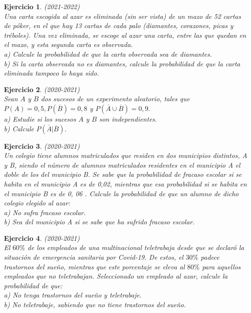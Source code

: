 \documentclass[12pt, a4paper]{amsart}
\newtheorem{ejer}{Ejercicio}
\begin{document}
\begin{ejer}\em (2021-2022)\\
Una carta escogida al azar es eliminada (sin ser vista) de un mazo de 52 cartas de póker, en el que hay 13 cartas de cada palo (diamantes, corazones, picas y tréboles). Una vez eliminada, se escoge al azar una carta, entre las que quedan en el mazo, y esta segunda carta es observada.\\
a) Calcule la probabilidad de que la carta observada sea de diamantes.\\
b) Si la carta observada no es diamantes, calcule la probabilidad de que la carta eliminada tampoco lo haya sido.
\end{ejer}

\begin{ejer}\em (2020-2021)\\
Sean $A$ y $B$ dos sucesos de un experimento aleatorio, tales que $P (A) = 0, 5 , P (\overline{B}) = 0, 8$ y $P (\overline{A} \cup \overline{B}) = 0, 9.$\\
a) Estudie si los sucesos $A$ y $B$ son independientes.\\
b) Calcule $P (\overline{A}|\overline{B}) .$
\end{ejer}

\begin{ejer}\em (2020-2021)\\
Un colegio tiene alumnos matriculados que residen en dos municipios distintos, A y B, siendo el número de alumnos matriculados residentes en el municipio A el doble de los del municipio B. Se sabe que la probabilidad de fracaso escolar si se habita en el municipio A es de 0,02, mientras que esa probabilidad si se habita en el municipio B es de 0, 06 . Calcule la probabilidad de que un alumno de dicho colegio elegido al azar:\\
a) No sufra fracaso escolar.\\
b) Sea del municipio A si se sabe que ha sufrido fracaso escolar.
\end{ejer}

\begin{ejer}\em (2020-2021)\\
El $60\%$ de los empleados de una multinacional teletrabaja desde que se declaró la situación de emergencia
sanitaria por Covid-19. De estos, el $30\%$ padece trastornos del sueño, mientras que este porcentaje se eleva al
$80\%$ para aquellos empleados que no teletrabajan. Seleccionado un empleado al azar, calcule la probabilidad
de que:\\
a) No tenga trastornos del sueño y teletrabaje.\\
b) No teletrabaje, sabiendo que no tiene trastornos del sueño.
\end{ejer}
\end{document}

